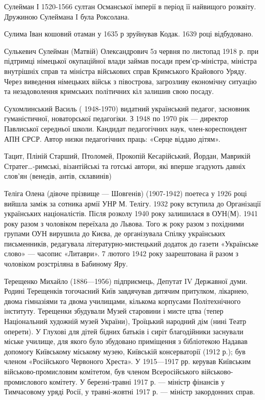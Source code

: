 Сулейман І 1520-1566 султан Османської імперії в період її найвищого розквіту. Дружиною Сулеймана I була Роксолана.

Сулима Іван  кошовий отаман у 1635 р зруйнував Кодак. 1639 році відбудовано.

Сулькевич Сулейман (Матвій) Олександрович  5з червня по  листопад 1918 р. при підтримці німецької окупаційної влади займав посади прем'єр-міністра, міністра внутрішніх справ та міністра військових справ Кримського Крайового Уряду. Через виведення німецьких військ з півострова, загрозливу економічну ситуацію та незадоволення кримських політичних кіл залишив свою посаду. 

Сухомлинський Василь  ( 1948-1970) видатний український педагог, засновник гуманістичної, новаторської педагогіки. З 1948 по 1970 рік — директор Павлиської середньої школи. Кандидат педагогічних наук, член-кореспондент АПН СРСР. Автор низки педагогічних праць: «Серце віддаю дітям». 

Тацит, Пліній Старший, Птоломей, Прокопій Кесарійський, Йордан, Маврикій Стратег…-римські, візантійські та готські автори, які вперше згадують давніх слов’ян (венедів, антів, склавинів)

Теліга Олена (дівоче прізвище — Шовгенів) (1907-1942) поетеса у 1926 році вийшла заміж за сотника армії УНР М. Телігу. 1932 року вступила до Організації українських націоналістів. Після розколу 1940 року залишилася в ОУН(М). 1941 року разом з чоловіком переїхала до Львова. Того ж року разом з похідними групами ОУН вирушила до Києва, де організувала Спілку українських письменників, редагувала літературно-мистецький додаток до газети «Українське слово» — часопис «Литаври». 7 лютого 1942 року заарештована й разом з чоловіком розстріляна в Бабиному Яру.

Терещенко Михайло (1886—1956)  підприємець,  Депутат IV Державної думи. Родині Терещенків тогочасний Київ завдячував дитячим притулком, лікарнею, двома гімназіями та двома училищами, кількома корпусами Політехнічного інституту. Терещенки збудували Музей старовини і мисте цтва (тепер Національний художній музей України), Троїцький народний дім (нині Театр оперети). У Глухові для дітей бідних батьків і сиріт благодійники заснували міське училище, для якого було збудовано приміщення з бібліотекою Надавав допомогу Київському міському музею, Київській консерваторії (1912 р.); був членом «Російського Червоного Хреста». У 1915—1917 рр. керував Київським військово-промисловим комітетом, був членом Всеросійського військово-промислового комітету. У березні-травні 1917 р. — міністр фінансів у Тимчасовому уряді Росії, у травні-жовтні 1917 р. — міністр закордонних справ.

